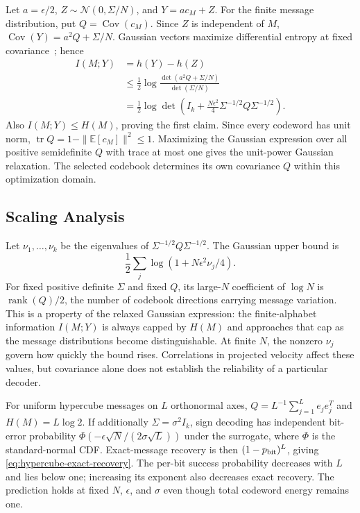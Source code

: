 \documentclass[11pt]{article}
\begin{document}
Let $a=\epsilon/2$, $Z\sim\mathcal N(0,\Sigma/N)$, and
$Y=a c_M+Z$. For the finite message distribution, put
$Q=\operatorname{Cov}(c_M)$. Since $Z$ is independent of $M$,
$\operatorname{Cov}(Y)=a^2Q+\Sigma/N$. Gaussian vectors maximize
differential entropy at fixed covariance~\cite{cover1999elements}; hence
\begin{align}
I(M;Y)
&=h(Y)-h(Z)\\
&\leq\frac12\log\frac{\det(a^2Q+\Sigma/N)}{\det(\Sigma/N)}\\
&=\frac12\log\det\!\left(I_k+
\frac{N\epsilon^2}{4}\Sigma^{-1/2}Q\Sigma^{-1/2}\right).
\end{align}
Also $I(M;Y)\leq H(M)$, proving the first claim. Since every
codeword has unit norm,
$\operatorname{tr}Q=1-\|\mathbb E[c_M]\|^2\leq1$.
Maximizing the Gaussian expression over all positive semidefinite
$Q$ with trace at most one gives the unit-power Gaussian relaxation.
The selected codebook determines its own covariance $Q$ within this
optimization domain.

\subsection{Scaling Analysis}\label{app:hypercube-scaling}

Let $\nu_1,\ldots,\nu_k$ be the eigenvalues of
$\Sigma^{-1/2}Q\Sigma^{-1/2}$. The Gaussian upper bound is
\[
\frac12\sum_j\log(1+N\epsilon^2\nu_j/4).
\]
For fixed positive definite $\Sigma$ and fixed $Q$, its large-$N$
coefficient of $\log N$ is $\operatorname{rank}(Q)/2$, the number of codebook
directions carrying message variation. This is a property of the relaxed
Gaussian expression: the finite-alphabet information $I(M;Y)$ is
always capped by $H(M)$ and approaches that cap as the message
distributions become distinguishable. At finite $N$, the nonzero
$\nu_j$ govern how quickly the bound rises. Correlations in projected
velocity affect these values, but covariance alone does not establish
the reliability of a particular decoder.

For uniform hypercube messages on $L$ orthonormal axes,
$Q=L^{-1}\sum_{j=1}^Le_je_j^T$ and $H(M)=L\log 2$. If additionally
$\Sigma=\sigma^2 I_k$, sign decoding has independent bit-error
probability $\Phi(-\epsilon\sqrt{N}/(2\sigma\sqrt L))$ under the
surrogate, where $\Phi$ is the standard-normal CDF. Exact-message
recovery is then $(1-p_{\rm bit})^L$, giving
\eqref{eq:hypercube-exact-recovery}. The per-bit success probability
decreases with $L$ and lies below one; increasing its exponent also
decreases exact recovery. The prediction holds at fixed $N$,
$\epsilon$, and $\sigma$ even though total codeword energy remains one.
\end{document}
